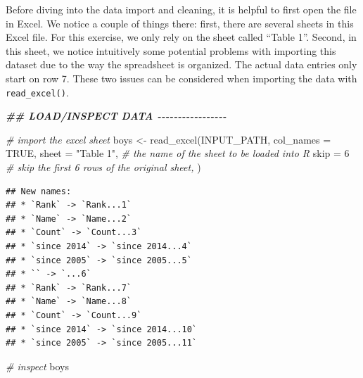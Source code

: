 \documentclass[
  12pt,
]{style/krantz}
\newenvironment{Shaded}{\begin{snugshade}}{\end{snugshade}}
\newcommand{\AttributeTok}[1]{\textcolor[rgb]{0.77,0.63,0.00}{#1}}
\newcommand{\CommentTok}[1]{\textcolor[rgb]{0.56,0.35,0.01}{\textit{#1}}}
\newcommand{\ConstantTok}[1]{\textcolor[rgb]{0.00,0.00,0.00}{#1}}
\newcommand{\DecValTok}[1]{\textcolor[rgb]{0.00,0.00,0.81}{#1}}
\newcommand{\DocumentationTok}[1]{\textcolor[rgb]{0.56,0.35,0.01}{\textbf{\textit{#1}}}}
\newcommand{\FunctionTok}[1]{\textcolor[rgb]{0.00,0.00,0.00}{#1}}
\newcommand{\NormalTok}[1]{#1}
\newcommand{\OtherTok}[1]{\textcolor[rgb]{0.56,0.35,0.01}{#1}}
\newcommand{\StringTok}[1]{\textcolor[rgb]{0.31,0.60,0.02}{#1}}
\begin{document}
Before diving into the data import and cleaning, it is helpful to first open the file in Excel. We notice a couple of things there: first, there are several sheets in this Excel file. For this exercise, we only rely on the sheet called ``Table 1''. Second, in this sheet, we notice intuitively some potential problems with importing this dataset due to the way the spreadsheet is organized. The actual data entries only start on row 7. These two issues can be considered when importing the data with \texttt{read\_excel()}.

\begin{Shaded}
\begin{Highlighting}[]
\DocumentationTok{\#\# LOAD/INSPECT DATA {-}{-}{-}{-}{-}{-}{-}{-}{-}{-}{-}{-}{-}{-}{-}{-}{-}}

\CommentTok{\# import the excel sheet}
\NormalTok{boys }\OtherTok{\textless{}{-}} \FunctionTok{read\_excel}\NormalTok{(INPUT\_PATH, }\AttributeTok{col\_names =} \ConstantTok{TRUE}\NormalTok{,}
                   \AttributeTok{sheet =} \StringTok{"Table 1"}\NormalTok{, }\CommentTok{\# the name of the sheet to be loaded into R}
                   \AttributeTok{skip =} \DecValTok{6} \CommentTok{\# skip the first 6 rows of the original sheet,}
\NormalTok{                   )}
\end{Highlighting}
\end{Shaded}

\begin{verbatim}
## New names:
## * `Rank` -> `Rank...1`
## * `Name` -> `Name...2`
## * `Count` -> `Count...3`
## * `since 2014` -> `since 2014...4`
## * `since 2005` -> `since 2005...5`
## * `` -> `...6`
## * `Rank` -> `Rank...7`
## * `Name` -> `Name...8`
## * `Count` -> `Count...9`
## * `since 2014` -> `since 2014...10`
## * `since 2005` -> `since 2005...11`
\end{verbatim}

\begin{Shaded}
\begin{Highlighting}[]
\CommentTok{\# inspect}
\NormalTok{boys}
\end{Highlighting}
\end{Shaded}
\end{document}
